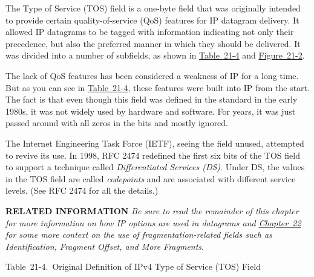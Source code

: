 The
Type of
Service (TOS) field is a one-byte field that was originally intended to
provide certain quality-of-service (QoS) features for IP datagram
delivery. It allowed IP datagrams to be tagged with information
indicating not only their precedence, but also the preferred manner in
which they should be delivered. It was divided into a number of
subfields, as shown in
\protect\hyperlink{ch21s02.htmlux5cux23original_definition_of_ipv_type_of_servi}{Table~21-4}
and
\protect\hyperlink{ch21s02.htmlux5cux23ipv4_datagram_format_this_diagram_shows_}{Figure~21-2}.

The lack of QoS features has been considered a weakness of IP for a long
time. But as you can see in
\protect\hyperlink{ch21s02.htmlux5cux23original_definition_of_ipv_type_of_servi}{Table~21-4},
these features were built into IP from the start. The fact is that even
though this field was defined in the standard in the early 1980s, it was
not widely used by hardware and software. For years, it was just passed
around with all zeros in the bits and mostly ignored.

The Internet Engineering Task Force (IETF), seeing the field unused,
attempted to revive its use. In 1998, RFC 2474 redefined the first six
bits of the TOS field to support a technique called
{\emph{Differentiated
Services (DS)}}. Under DS, the values in the TOS field are called
{\emph{codepoints}} and are associated with different service levels.
(See RFC 2474 for all the details.)


{\textbf{RELATED INFORMATION}} {\emph{Be sure to read the remainder of
this chapter for more information on how IP options are used in
datagrams and \protect\hyperlink{ch22.html}{Chapter~22} for some more
context on the use of fragmentation-related fields such as
Identification, Fragment Offset, and More Fragments}}.



Table~21-4.~Original Definition of IPv4 Type of Service (TOS) Field


